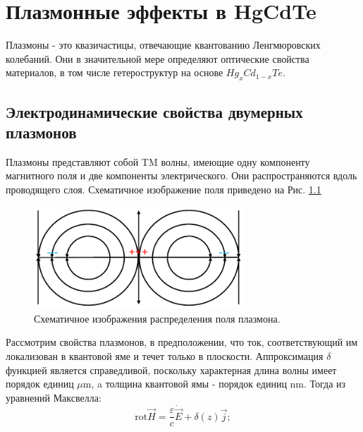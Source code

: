 \documentclass[../main.tex]{subfiles}
\newcommand{\rot}{\text{rot}}
\begin{document}
    \chapter{Плазмонные эффекты в HgCdTe}
    
    Плазмоны - это квазичастицы, отвечающие квантованию 
    Ленгмюровских колебаний. Они в значительной мере 
    определяют оптические свойства материалов, в том числе 
    гетероструктур на основе $Hg_xCd_{1-x}Te$.

    \section{Электродинамические свойства двумерных плазмонов}

    Плазмоны представляют собой TM волны, имеющие одну компоненту 
    магнитного поля и две компоненты электрического. Они распространяются 
    вдоль проводящего слоя. Схематичное изображение поля приведено на 
    Рис. \ref{plasmons:schematic:fiels} 

    \begin{figure}[h]
        \begin{minipage}[h]{1\textwidth}
            \includegraphics[width=0.7\textwidth]{./images/schematic_field.pdf}
            \caption{Схематичное изображения распределения поля плазмона.
            \label{plasmons:schematic:fiels}}
        \end{minipage}
    \end{figure}

    Рассмотрим свойства плазмонов, в предположении, что ток,
    соответствующий им локализован в квантовой яме и течет только
    в плоскости. Аппроксимация $\delta$ функцией является 
    справедливой, поскольку характерная длина волны имеет порядок 
    единиц $\mu\text{m}$, a толщина квантовой ямы - порядок единиц 
    $\text{nm}$. Тогда из уравнений Максвелла:
    \begin{equation}
        \rot \vec H = \frac{\varepsilon}{c} \dot{\vec E} + \delta(z) \vec j;
    \end{equation}
\end{document}
